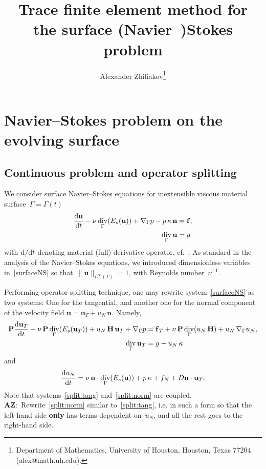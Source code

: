 \documentclass[12pt]{article}
\title{Trace finite element method for the surface (Navier--)Stokes problem}
\author{
	Alexander Zhiliakov\thanks{Department of Mathematics, University of Houston, Houston, Texas 77204 (alex@math.uh.edu).}
}
\newcommand{\vect}[1]{\boldsymbol{\mathbf{#1}}}
\DeclareMathOperator{\Div}{div}
\newcommand{\LInfSpace}[1][\Gamma]{{L^\infty\left({#1}\right)}}
\newcommand{\AZ}[1]{{\color{red}\textbf{AZ}:~#1}}
\begin{document}
	
\maketitle

\tableofcontents
\vfill
\clearpage
\let\oldtabular\tabular
\renewcommand{\tabular}[1][1.5]{\def\arraystretch{#1}\oldtabular}

\section{Navier--Stokes problem on the evolving surface}

\subsection{Continuous problem and operator splitting}

We consider surface Navier--Stokes equations for inextensible viscous material surface~$\Gamma = \Gamma(t)$
\begin{align}\begin{split}\label{surfaceNS}
	\frac{\mbox d\vect u}{\mbox d t} - \nu\Div_\Gamma(E_s(\vect u)) + \nabla_\Gamma p - p\,\kappa\,\vect n &= \vect f,\\
	\Div_\Gamma \vect u &= g
\end{split}\end{align}
with $\mbox d / \mbox d t$ denoting material (full) derivative operator, cf.~\cite[p.~8]{Jankuhn_2018}. As standard in the analysis of the Navier--Stokes equations, we introduced dimensionless variables in~\eqref{surfaceNS} so that~$\|\vect u\|_{\LInfSpace} = 1$, with Reynolds number~$\nu^{-1}$. 

Performing operator splitting technique, one may rewrite system~\eqref{surfaceNS} as two systems: One for the tangential, and another one for the normal component of the velocity field $\vect u = \vect u_T + u_N\,\vect n$. Namely,
\begin{align}\begin{split}\label{split:tang}
	\vect P \frac{\mbox d\vect u_T}{\mbox d t} - \nu\,\vect P\Div_\Gamma(E_s(\vect u_T)) + u_N\,\vect H\,\vect u_T + \nabla_\Gamma p &= \vect f_T + \nu\,\vect P \Div_\Gamma(u_N\,\vect H) + u_N\,\nabla_\Gamma u_N,\\
	\Div_\Gamma \vect u_T &= g - u_N\,\kappa
\end{split}\end{align}
and 
\begin{equation}\label{split:norm}
	\frac{\mbox d u_N}{\mbox d t} = \nu\,\vect n\cdot\Div_\Gamma(E_s(\vect u)) + p\,\kappa + f_N + D \vect n\cdot\vect u_T. 	
\end{equation}
Note that systems~\eqref{split:tang} and~\eqref{split:norm} are coupled. \AZ{Rewrite~\eqref{split:norm} similar to~\eqref{split:tang}, i.e. in such a form so that the left-hand side \textbf{only} has terms dependent on~$u_N$, and all the rest goes to the right-hand side.}
\end{document}
